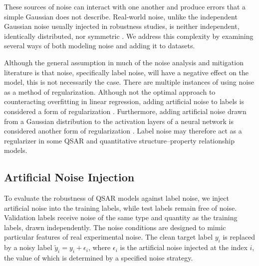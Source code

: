 These sources of noise can interact with one another and produce errors that a simple Gaussian does not describe. Real-world noise, unlike the independent Gaussian noise usually injected in robustness studies, is neither independent, identically distributed, nor symmetric \citep{Heid2023}. We address this complexity by examining several ways of both modeling noise and adding it to datasets.

Although the general assumption in much of the noise analysis and mitigation literature is that noise, specifically label noise, will have a negative effect on the model, this is not necessarily the case. There are multiple instances of using noise as a method of regularization. Although not the optimal approach to counteracting overfitting in linear regression, adding artificial noise to labels is considered a form of regularization \citep{Ullah2024}. Furthermore, adding artificial noise drawn from a Gaussian distribution to the activation layers of a neural network is considered another form of regularization \citep{Camuto2021}. Label noise may therefore act as a regularizer in some QSAR and quantitative structure--property relationship models.

\subsection{Artificial Noise Injection}\label{sec:noise_injection}

To evaluate the robustness of QSAR models against label noise, we inject artificial noise into the training labels, while test labels remain free of noise. Validation labels receive noise of the same type and quantity as the training labels, drawn independently. The noise conditions are designed to mimic particular features of real experimental noise. The clean target label $y_i$ is replaced by a noisy label $\tilde{y}_i = y_i + \epsilon_i$, where $\epsilon_i$ is the artificial noise injected at the index $i$, the value of which is determined by a specified noise strategy.

